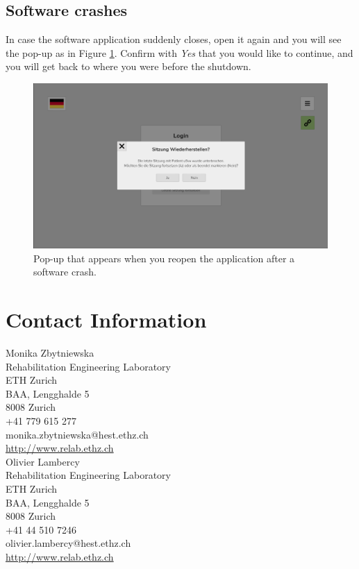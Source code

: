 \documentclass[10pt,oneside,a4paper]{article}
\begin{document}
\subsection{Software crashes}
In case the software application suddenly closes, open it again and you will see the pop-up as in Figure \ref{fig:Crash}. Confirm with \emph{Yes} that you would like to continue, and you will get back to where you were before the shutdown.

\begin{figure}[h!]
\begin{center}
\includegraphics[width=\columnwidth]{images/Troubleshooting/SoftwareCrash.png}
\caption{Pop-up that appears when you reopen the application after a software crash.}
\label{fig:Crash}
\end{center}
\end{figure}

\newpage
\section{Contact Information}
Monika Zbytniewska\\
Rehabilitation Engineering Laboratory\\
ETH Zurich\\
BAA, Lengghalde 5\\
8008 Zurich\\
+41 779 615 277\\
monika.zbytniewska@hest.ethz.ch\\
\href{http://www.relab.ethz.ch}{http://www.relab.ethz.ch}\\

Olivier Lambercy\\
Rehabilitation Engineering Laboratory\\
ETH Zurich\\
BAA, Lengghalde 5\\
8008 Zurich\\
+41 44 510 7246\\
olivier.lambercy@hest.ethz.ch\\
\href{http://www.relab.ethz.ch}{http://www.relab.ethz.ch}\\
\end{document}
